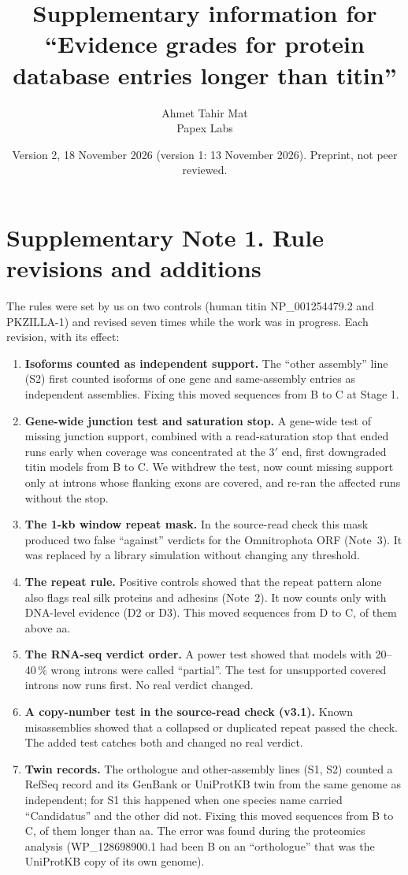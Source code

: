 \documentclass[11pt]{article}
\title{Supplementary information for ``Evidence grades for protein database entries longer than titin''}
\author{Ahmet Tahir Mat\\[2pt]\small Papex Labs}
\date{\small Version 2, 18 November 2026 (version 1: 13 November 2026). Preprint, not peer reviewed.}
\begin{document}
\maketitle
\linenumbers
\tableofcontents

\section*{Supplementary Note 1. Rule revisions and additions}

The rules were set by us on two controls (human titin NP\_001254479.2 and PKZILLA-1) and revised seven times while the
work was in progress. Each revision, with its effect:

\begin{enumerate}[leftmargin=*]
\item \textbf{Isoforms counted as independent support.} The ``other assembly'' line (S2) first counted isoforms of one gene
and same-assembly entries as independent assemblies. Fixing this moved  sequences from B to C at Stage 1.
\item \textbf{Gene-wide junction test and saturation stop.} A gene-wide test of missing junction support, combined with a
read-saturation stop that ended runs early when coverage was concentrated at the 3$'$ end, first downgraded
 titin models from B to C. We withdrew the test, now count missing support only at introns
whose flanking exons are covered, and re-ran the affected runs without the stop.
\item \textbf{The 1-kb window repeat mask.} In the source-read check this mask produced two false ``against'' verdicts for
the Omnitrophota ORF (Note~3). It was replaced by a library simulation without changing any threshold.
\item \textbf{The repeat rule.} Positive controls showed that the repeat pattern alone also flags real silk proteins and
adhesins (Note~2). It now counts only with DNA-level evidence (D2 or D3). This moved  sequences from D
to C,  of them above  aa.
\item \textbf{The RNA-seq verdict order.} A power test showed that models with 20--40\,\% wrong introns were called
``partial''. The test for unsupported covered introns now runs first. No real verdict changed.
\item \textbf{A copy-number test in the source-read check (v3.1).} Known misassemblies showed that a collapsed or duplicated
repeat passed the check. The added test catches both and changed no real verdict.
\item \textbf{Twin records.} The orthologue and other-assembly lines (S1, S2) counted a RefSeq record and its GenBank or
UniProtKB twin from the same genome as independent; for S1 this happened when one species name carried ``Candidatus'' and
the other did not. Fixing this moved  sequences from B to C,  of them longer than  aa. The error was found during
the proteomics analysis (WP\_128698900.1 had been B on an ``orthologue'' that was the UniProtKB copy of its own genome).
\end{enumerate}
\end{document}
